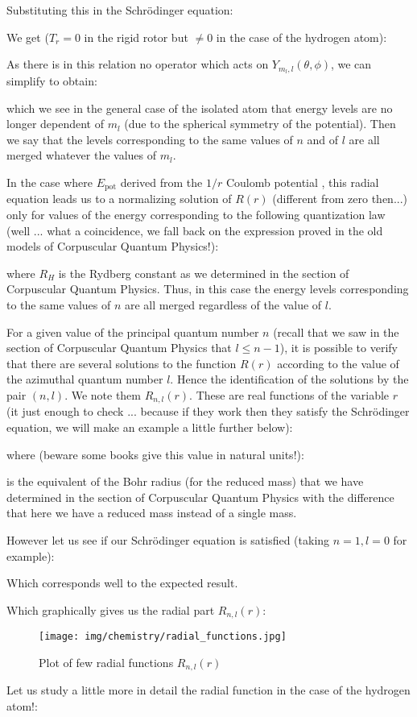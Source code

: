 	Substituting this in the Schrödinger equation:
	
	We get ($T_r=0$ in the rigid rotor but $\neq 0$ in the case of the hydrogen atom):
	
	As there is in this relation no operator which acts on $Y_{m_l,l}(\theta,\phi)$, we can simplify to obtain:
	
	which we see in the general case of the isolated atom that energy levels are no longer dependent of $m_l$ (due to the spherical symmetry of the potential). Then we say that the levels corresponding to the same values of $n$ and of $l$ are all merged whatever the values of $m_l$.
	
	In the case where $E_\text{pot}$ derived from the $1 / r$ Coulomb potential , this radial equation leads us to a normalizing solution of $R (r)$ (different from zero then...) only for values of the energy corresponding to the following quantization law (well ... what a coincidence, we fall back on the expression proved in the old models of Corpuscular Quantum Physics!):
	
	where $R_H$ is the Rydberg constant as we determined in the section of Corpuscular Quantum Physics. Thus, in this case the energy levels corresponding to the same values of $n$ are all merged regardless of the value of $l$.

	For a given value of the principal quantum number $n$ (recall that we saw in the section of Corpuscular Quantum Physics that $l\leq n-1$), it is possible to verify that there are several solutions to the function $R(r)$ according to the value of the azimuthal quantum number $l$. Hence the identification of the solutions by the pair $(n, l)$. We note them $R_{n,l}(r)$. These are real functions of the variable $r$ (it just enough to check ... because if they work then they satisfy the Schrödinger equation, we will make an example a little further below):
	
	where (beware some books give this value in natural units!):
	
	is the equivalent of the Bohr radius (for the reduced mass) that we have determined in the section of Corpuscular Quantum Physics  with the difference that here we have a reduced mass instead of a single mass.
	
	However let us see if our Schrödinger equation is satisfied (taking $n=1,l=0$ for example):
	
	Which corresponds well to the expected result.

	Which graphically gives us the radial part $R_{n,l}(r)$:
	\begin{figure}[H]
		\centering
		\texttt{[image: img/chemistry/radial\_functions.jpg]}	
		\caption{Plot of few radial functions $R_{n,l}(r)$}
	\end{figure}
	Let us study a little more in detail the radial function in the case of the hydrogen atom!:

